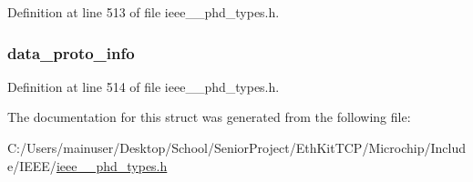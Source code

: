 Definition at line 513 of file ieee\+\_\+\_\+phd\+\_\+types.\+h.

\hypertarget{struct___data_proto_aa58a3ce936ed219fb660dcb2bcd1dece}{}
\subsubsection[{data\+\_\+proto\+\_\+info}]{ data\+\_\+proto\+\_\+info}\label{struct___data_proto_aa58a3ce936ed219fb660dcb2bcd1dece}


Definition at line 514 of file ieee\+\_\+\_\+phd\+\_\+types.\+h.



The documentation for this struct was generated from the following file\+:\begin{DoxyCompactItemize}
\item 
C\+:/\+Users/mainuser/\+Desktop/\+School/\+Senior\+Project/\+Eth\+Kit\+T\+C\+P/\+Microchip/\+Include/\+I\+E\+E\+E/\hyperlink{ieee__11073__phd__types_8h}{ieee\+\_\+\_\+phd\+\_\+types.\+h}\end{DoxyCompactItemize}
